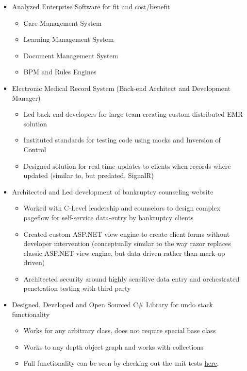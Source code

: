 \documentclass[12pt,letterpaper,sans]{moderncv}
\begin{document}
    \begin{itemize}[leftmargin=1.24in]
        \item Analyzed Enterprise Software for fit and cost/benefit
            \begin{itemize}
                \item Care Management System
                \item Learning Management System
                \item Document Management System
                \item BPM and Rules Engines
            \end{itemize}        
        \item Electronic Medical Record System (Back-end Architect and Development Manager)
            \begin{itemize}
                \item Led back-end developers for large team creating custom distributed EMR solution 
                \item Instituted standards for testing code using mocks and Inversion of Control
                \item Designed solution for real-time updates to clients when records where updated (similar to, but predated, SignalR)
            \end{itemize}
        \item Architected and Led development of bankruptcy counseling website
            \begin{itemize}
                \item Worked with C-Level leadership and counselors to design complex pageflow for self-service data-entry by bankruptcy clients
                \item Created custom ASP.NET view engine to create client forms without developer intervention (conceptually similar to the way razor replaces classic ASP.NET view engine, but data driven rather than mark-up driven)
                \item Architected security around highly sensitive data entry and orchestrated penetration testing with third party
            \end{itemize}
        \item Designed, Developed and Open Sourced C\# Library for undo stack functionality
            \begin{itemize}
                \item Works for any arbitrary class, does not require special base class
                \item Works to any depth object graph and works with collections
                \item Full functionality can be seen by checking out the unit tests \href{https://github.com/jasallen/ShadowedObjects/blob/master/ShadowedObjectsTests/UnitTest1.cs}{here}.
            \end{itemize}
    \end{itemize}
\end{document}
